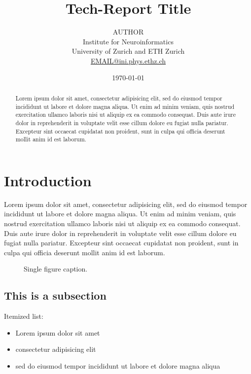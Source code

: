 \documentclass[pdftext,twoside,11pt]{article}
\title{Tech-Report Title}
\author{AUTHOR\\
  Institute for Neuroinformatics\\
  University of Zurich and ETH Zurich\\
  \url{EMAIL@ini.phys.ethz.ch}
}
\date{\today}
\begin{document}
\maketitle

\begin{abstract}
Lorem ipsum dolor sit amet, consectetur adipisicing elit, sed do
eiusmod tempor incididunt ut labore et dolore magna aliqua. Ut enim ad
minim veniam, quis nostrud exercitation ullamco laboris nisi ut
aliquip ex ea commodo consequat. Duis aute irure dolor in
reprehenderit in voluptate velit esse cillum dolore eu fugiat nulla
pariatur. Excepteur sint occaecat cupidatat non proident, sunt in
culpa qui officia deserunt mollit anim id est laborum.
\end{abstract}


\section{Introduction}
\label{sec:intro} 

Lorem ipsum dolor sit amet, consectetur adipisicing elit, sed do
eiusmod tempor incididunt ut labore et dolore magna aliqua. Ut enim ad
minim veniam, quis nostrud exercitation ullamco laboris nisi ut
aliquip ex ea commodo consequat. Duis aute irure dolor in
reprehenderit in voluptate velit esse cillum dolore eu fugiat nulla
pariatur. Excepteur sint occaecat cupidatat non proident, sunt in
culpa qui officia deserunt mollit anim id est laborum.

\begin{figure}
  \centering
\caption{Single figure caption.} 
\label{fig:FIGURE_LABEL}
\end{figure}

\subsection{This is a subsection}

Itemized list:
\begin{itemize}
\item Lorem ipsum dolor sit amet
\item consectetur adipisicing elit
\item sed do eiusmod tempor incididunt ut labore et dolore magna
  aliqua
\end{itemize}
\end{document}
